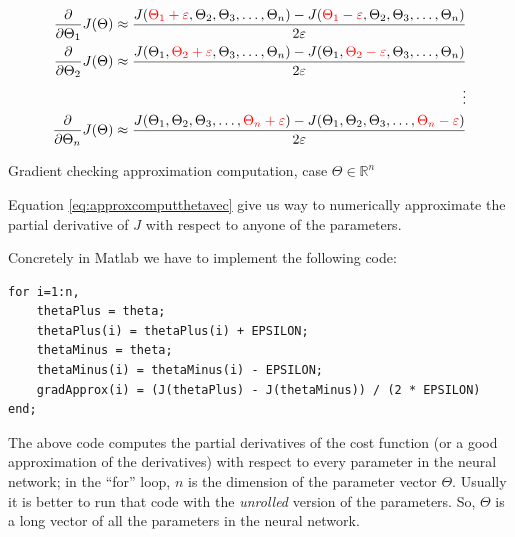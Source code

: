 \begin{eqfloat}[H]
\begin{equation}
	\begin{aligned}	
	\frac{\partial}{\partial \Theta_1} J(\Theta) \approx \frac{J(\textcolor{red}{\Theta_1 + \varepsilon}, \Theta_2, \Theta_3, \hdots, \Theta_n) - J(\textcolor{red}{\Theta_1 - \varepsilon}, \Theta_2, \Theta_3, \hdots, \Theta_n)}{2 \varepsilon} \\
		\frac{\partial}{\partial \Theta_2} J(\Theta) \approx \frac{J(\Theta_1,\textcolor{red}{ \Theta_2 + \varepsilon} , \Theta_3, \hdots, \Theta_n) - J(\Theta_1,\textcolor{red}{ \Theta_2 - \varepsilon}, \Theta_3, \hdots, \Theta_n)}{2 \varepsilon} \\
\vdots \\
		\frac{\partial}{\partial \Theta_n} J(\Theta) \approx \frac{J(\Theta_1, \Theta_2, \Theta_3, \hdots, \textcolor{red}{\Theta_n+ \varepsilon}) - J(\Theta_1, \Theta_2, \Theta_3, \hdots, \textcolor{red}{\Theta_n - \varepsilon})}{2 \varepsilon} \\
	\end{aligned}	
\end{equation}
      \addtocounter{equation}{-1}
        \caption{ Gradient checking approximation computation, case $\Theta \in \mathbb{R}^n$ }
        \label{eq:approxcomputthetavec}
    \end{eqfloat}
    
Equation \ref{eq:approxcomputthetavec} give us  way to numerically approximate the partial derivative of $J$ with respect to anyone of the parameters. 

Concretely in Matlab we have to implement the following code:

\begin{mdframed}[style=MyFrame]
\begin{lstlisting}
for i=1:n,
	thetaPlus = theta;
	thetaPlus(i) = thetaPlus(i) + EPSILON;
	thetaMinus = theta;
	thetaMinus(i) = thetaMinus(i) - EPSILON;
	gradApprox(i) = (J(thetaPlus) - J(thetaMinus)) / (2 * EPSILON)
end;
\end{lstlisting}
\end{mdframed}

The above code computes the partial derivatives of the cost function (or a good approximation of the derivatives) with respect to every parameter in the neural network; in the ``for'' loop, $n$ is the dimension of the parameter vector $\Theta$. Usually it is better to run that code with the {\it unrolled} version of the parameters. So, $\Theta$ is a long vector of all the parameters in the neural network.

